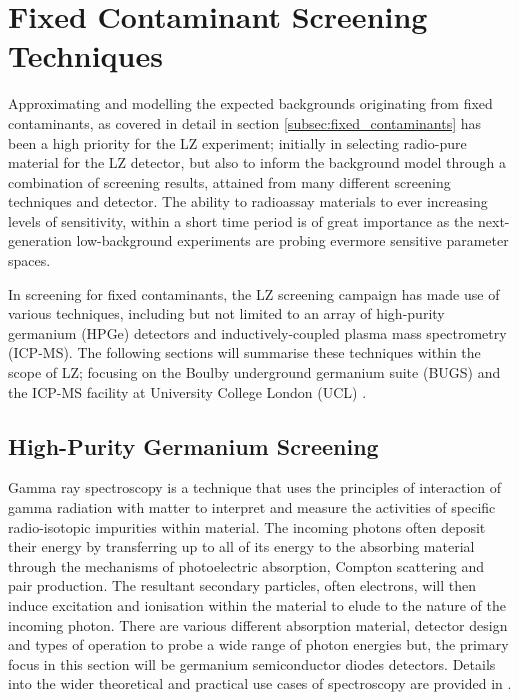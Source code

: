 \section{Fixed Contaminant Screening Techniques}
\label{sec:fixed_contaminant_screening}

Approximating and modelling the expected backgrounds originating from fixed contaminants, as covered in detail in section \ref{subsec:fixed_contaminants} has been a high priority for the LZ experiment; initially in selecting radio-pure material for the LZ detector, but also to inform the background model through a combination of screening results, attained from many different screening techniques and detector. The ability to radioassay materials to ever increasing levels of sensitivity, within a short time period is of great importance as the next-generation low-background experiments are probing evermore sensitive parameter spaces. 

In screening for fixed contaminants, the LZ screening campaign has made use of various techniques, including but not limited to an array of high-purity germanium (HPGe) detectors and inductively-coupled plasma mass spectrometry (ICP-MS). The following sections will summarise these techniques within the scope of LZ; focusing on the Boulby underground germanium suite (BUGS) \cite{bugs_boulby} and the ICP-MS facility at University College London (UCL) \cite{icpms_ucl}. 


\subsection{High-Purity Germanium Screening}
\label{subsec:HPGe}

Gamma ray spectroscopy is a technique that uses the principles of interaction of gamma radiation with matter to interpret and measure the activities of specific radio-isotopic impurities within material. The incoming \gray{} photons often deposit their energy by transferring up to all of its energy to the absorbing material through the mechanisms of photoelectric absorption, Compton scattering and pair production. The resultant secondary particles, often electrons, will then induce excitation and ionisation within the material to elude to the nature of the incoming photon. There are various different absorption material, detector design and types of operation to probe a wide range of photon energies but, the primary focus in this section will be germanium semiconductor diodes detectors. Details into the wider theoretical and practical use cases of \gray{} spectroscopy are provided in \cite{gilmore2011practical}.

